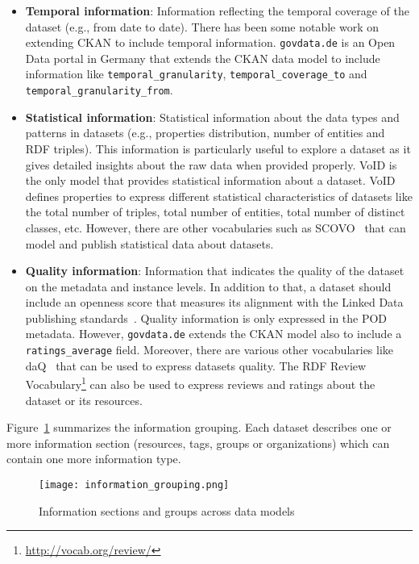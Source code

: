 \begin{itemize}
 \item \textbf{Temporal information}: Information reflecting the temporal coverage of the dataset (e.g., from date to date). There has been some notable work on extending CKAN to include temporal information. \texttt{govdata.de} is an Open Data portal in Germany that extends the CKAN data model to include information like \texttt{temporal\_granularity}, \texttt{temporal\_coverage\_to} and \\\texttt{temporal\_granularity\_from}.
 \item \textbf{Statistical information}: Statistical information about the data types and patterns in datasets (e.g., properties distribution, number of entities and RDF triples). This information is particularly useful to explore a dataset as it gives detailed insights about the raw data when provided properly. VoID is the only model that provides statistical information about a dataset. VoID defines properties to express different statistical characteristics of datasets like the total number of triples, total number of entities, total number of distinct classes, etc. However, there are other vocabularies such as SCOVO~\cite{Hausenblas:ESWC:09} that can model and publish statistical data about datasets.
 \item \textbf{Quality information}: Information that indicates the quality of the dataset on the metadata and instance levels. In addition to that, a dataset should include an openness score that measures its alignment with the Linked Data publishing standards~\cite{Berners-Lee:W3C:06}. Quality information is only expressed in the POD metadata. However, \texttt{govdata.de} extends the CKAN model also to include a \texttt{ratings\_average} field. Moreover, there are various other vocabularies like daQ~\cite{Debattista:WWW:14} that can be used to express datasets quality. The RDF Review Vocabulary\footnote{\url{http://vocab.org/review/}} can also be used to express reviews and ratings about the dataset or its resources.
\end{itemize}

Figure~\ref{fig:information_grouping} summarizes the information grouping. Each dataset describes one or more information section (resources, tags, groups or organizations) which can contain one more information type.

\begin{figure}[ht!]
\centering
	\texttt{[image: information\_grouping.png]}
	\caption{Information sections and groups across data models }
	\label{fig:information_grouping}
\end{figure}

